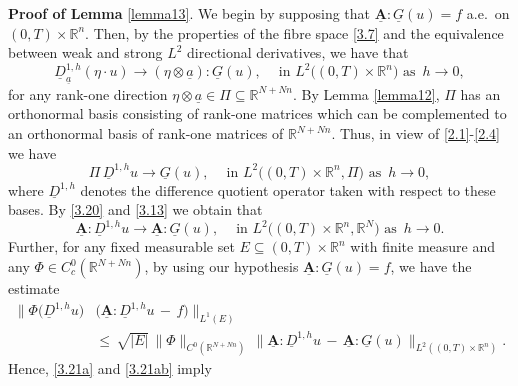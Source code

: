 \documentclass{amsart}
\theoremstyle{definition}
\numberwithin{equation}{section}
\begin{document}
{\medskip \noindent \textbf{Proof of Lemma} } \ref{lemma13}. We begin by supposing that ${\underline{\textbf{A}}} {\!:\!} \underline{G}(u)=f$ a.e.\ on $(0,T) {\times}  {\mathbb{R}}^n$. Then, by the properties of the fibre space \eqref{3.7} and the equivalence between weak and strong $L^2$ directional derivatives, we have that
\[
{\underline{D}}_{ \underline{a} }^{1,h}(\eta\cdot u) {\longrightarrow} (\eta {\otimes} \underline{a}) {\!:\!} \underline{G}(u), \ \ \ \ \text{ in }L^2\big( (0,T){\times} {\mathbb{R}}^n \big) \text{ as }\, h{\rightarrow}0,
\] 
for any rank-one direction $\eta {\otimes} \underline{a} \in \Pi {\subseteq} {\mathbb{R}}^{N+Nn}$. By Lemma \ref{lemma12}, $\Pi$ has an orthonormal basis consisting of rank-one matrices which can be complemented to an orthonormal basis of rank-one matrices of ${\mathbb{R}}^{N+Nn}$. Thus, in view of \eqref{2.1}-\eqref{2.4} we have
\begin{equation} \label{3.20}
\Pi \, {\underline{D}}^{1,h}u {\longrightarrow} \underline{G}(u), \ \ \ \ \text{ in }L^2\big( (0,T){\times} {\mathbb{R}}^n,\Pi \big) \text{ as }\, h{\rightarrow}0,
\end{equation} 
where ${\underline{D}}^{1,h}$ denotes the difference quotient operator taken with respect to these bases. By \eqref{3.20} and \eqref{3.13} we obtain that
\begin{equation} \label{3.21a}
{\underline{\textbf{A}}} {\!:\!}  {\underline{D}}^{1,h}u   {\longrightarrow} {\underline{\textbf{A}}}{\!:\!} \underline{G}(u), \ \ \ \ \text{ in }L^2\big( (0,T){\times} {\mathbb{R}}^n,{\mathbb{R}}^N \big) \text{ as }\, h{\rightarrow}0.
\end{equation}
Further, for any fixed measurable set $E{\subseteq}  (0,T){\times} {\mathbb{R}}^n$ with  finite measure and any $\Phi\in C^0_c({\mathbb{R}}^{N+Nn})$, by using our hypothesis $ {\underline{\textbf{A}}} : \underline{G}(u)=f$, we have the estimate
\begin{equation} \label{3.21ab}
\begin{split}
\Big\| \Phi\big({\underline{D}}^{1,h}u\big) & \Big( {\underline{\textbf{A}}} {\!:\!} {\underline{D}}^{1,h}u \,-\, f \Big) \Big\|_{L^1(E)}\\ 
&\leq\, 
\sqrt{|E|}\,\|\Phi\|_{C^0({\mathbb{R}}^{N+Nn})} \, 
\Big\|  {\underline{\textbf{A}}} {\!:\!} {\underline{D}}^{1,h}u \,-\,  {\underline{\textbf{A}}}{\!:\!}\underline{G}(u)\Big\|_{L^2((0,T){\times} {\mathbb{R}}^n)}.
\end{split}
\end{equation}
Hence, \eqref{3.21a} and \eqref{3.21ab} imply
\end{document}
